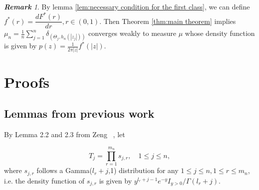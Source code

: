\documentclass[12pt]{article}
\theoremstyle{plain}
\newtheorem{cor}{\textbf{Corollary}}
\theoremstyle{definition}
\theoremstyle{remark}
\newtheorem{rem}{\textbf{Remark}}
\begin{document}


\begin{rem}
By lemma \ref{lem:necessary condition for the first class}, we can define $f^*(r)=\dfrac{d F^*(r)}{dr}, r\in (0,1)$. Then Theorem \ref{thm:main theorem} implies $\mu_{n}=\frac{1}{n} \sum_{j=1}^{n} \delta_{\left(\Theta_{j}, h_{n}\left(\left|z_{j}\right|\right)\right)}$ converges weakly to measure $\mu$ whose density function is given by $p(z)=\frac{1}{2 \pi|z|} f^{*}(|z|)$.
\end{rem}




 \noindent



\section{Proofs}

\subsection{Lemmas from previous work}
By Lemma 2.2 and 2.3 from Zeng ~\cite{zeng2017}, let

\begin{equation*}
T_{j}=\prod_{r=1}^{m_n} s_{j, r}, \quad 1 \leq j \leq n,
\end{equation*}
where $s_{j,r}$ follows a Gamma($l_r+j$,1) distribution for any $1 \leq j \leq n, 1 \leq r \leq m_n$, i.e. the density function of $s_{j,r}$ is given by $y^{l_{r}+j-1} e^{-y} I_{y>0} / \Gamma\left(l_{r}+j\right)$.\\
\end{document}
